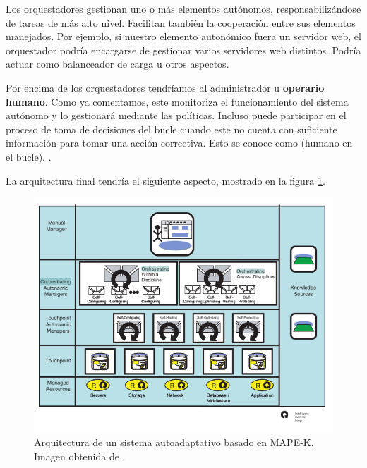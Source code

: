 Los orquestadores gestionan uno o más elementos autónomos, responsabilizándose de tareas de más alto nivel. Facilitan también la cooperación entre sus elementos manejados. Por ejemplo, si nuestro elemento autonómico fuera un servidor web, el orquestador podría encargarse de gestionar varios servidores web distintos. Podría actuar como balanceador de carga u otros aspectos.

Por encima de los orquestadores tendríamos al administrador u \textbf{operario humano}. Como ya comentamos, este monitoriza el funcionamiento del sistema autónomo y lo gestionará mediante las políticas. Incluso puede participar en el proceso de toma de decisiones del bucle cuando este no cuenta con suficiente información para tomar una acción correctiva. Esto se conoce como \textbf{} (humano en el bucle). \cite{gilDesigningHumanLoop2016a}.

La arquitectura final tendría el siguiente aspecto, mostrado en la figura \ref{fig:autonomic-system}.

\begin{figure}[htb]
  \centering
  \includegraphics[scale=0.6]{cap_contexto_tecnologico/images/mape-k-architecture}
  \caption[Arquitectura de un sistema autoadaptativo basado en MAPE-K.]{Arquitectura de un sistema autoadaptativo basado en MAPE-K. Imagen obtenida de \cite{ibmcorporationArchitecturalBlueprintAutonomic2006}.}
  \label{fig:autonomic-system}
\end{figure}
